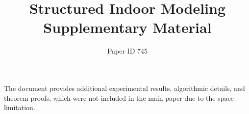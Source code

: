 \documentclass[10pt,twocolumn,letterpaper]{article}
\newcommand{\yasu}[1]{\textcolor{magenta}{[yasu: {#1}]}}
\begin{document}
\title{Structured Indoor Modeling\\Supplementary Material}
\author{Paper ID 745}
\maketitle
%

The document provides additional experimental results, algorithmic
details, and theorem proofs, which were not included in the main paper
due to the space limitation.



















{\small
	
	
}
\end{document}
